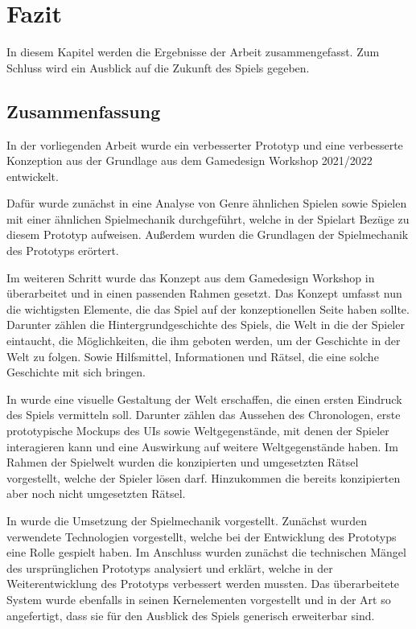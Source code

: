 \chapter{Fazit}\label{sec:fazit}
In diesem Kapitel werden die Ergebnisse der Arbeit zusammengefasst. Zum Schluss wird ein Ausblick auf die Zukunft des Spiels gegeben.
\section{Zusammenfassung}
In der vorliegenden Arbeit wurde ein verbesserter Prototyp und eine verbesserte Konzeption aus der Grundlage aus dem Gamedesign Workshop 2021/2022 entwickelt. 

Dafür wurde zunächst in   eine Analyse von Genre ähnlichen Spielen sowie Spielen mit einer ähnlichen Spielmechanik durchgeführt, welche in der Spielart Bezüge zu diesem Prototyp aufweisen. Außerdem wurden die Grundlagen der Spielmechanik des Prototyps erörtert.

Im weiteren Schritt wurde das Konzept aus dem Gamedesign Workshop in  überarbeitet und in einen passenden Rahmen gesetzt. Das Konzept umfasst nun die wichtigsten Elemente, die das Spiel auf der konzeptionellen Seite haben sollte. Darunter zählen die Hintergrundgeschichte des Spiels, die Welt in die der Spieler eintaucht, die Möglichkeiten, die ihm geboten werden, um der Geschichte in der Welt zu folgen. Sowie Hilfsmittel, Informationen und Rätsel, die eine solche Geschichte mit sich bringen.

In  wurde eine visuelle Gestaltung der Welt erschaffen, die einen ersten Eindruck des Spiels vermitteln soll. Darunter zählen das Aussehen des Chronologen, erste prototypische Mockups des \ac{UI}s sowie Weltgegenstände, mit denen der Spieler interagieren kann und eine Auswirkung auf weitere Weltgegenstände haben. Im Rahmen der Spielwelt wurden die konzipierten und umgesetzten Rätsel vorgestellt, welche der Spieler lösen darf. Hinzukommen die bereits konzipierten aber noch nicht umgesetzten Rätsel. 

In  wurde die Umsetzung der Spielmechanik vorgestellt. Zunächst wurden verwendete Technologien vorgestellt, welche bei der Entwicklung des Prototyps eine Rolle gespielt haben. Im Anschluss wurden zunächst die technischen Mängel des ursprünglichen Prototyps analysiert und erklärt, welche in der Weiterentwicklung des Prototyps verbessert werden mussten. Das überarbeitete System wurde ebenfalls in seinen Kernelementen vorgestellt und in der Art so angefertigt, dass sie für den Ausblick des Spiels generisch erweiterbar sind.

